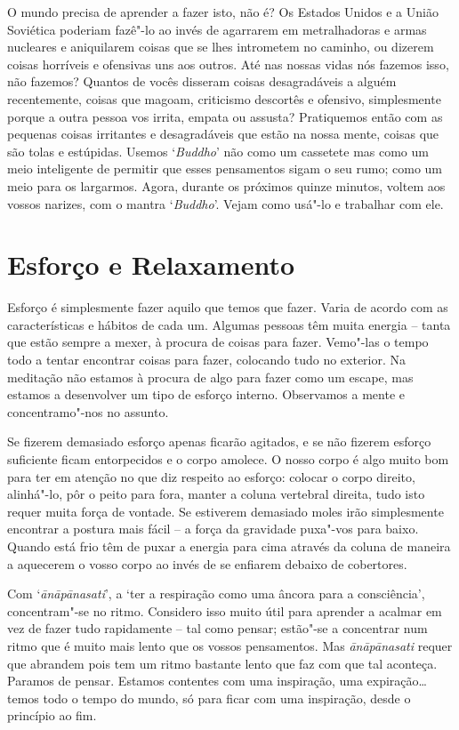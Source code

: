 O mundo precisa de aprender a fazer isto, não é? Os Estados Unidos e a
União Soviética poderiam fazê"-lo ao invés de agarrarem em metralhadoras
e armas nucleares e aniquilarem coisas que se lhes intrometem no
caminho, ou dizerem coisas horríveis e ofensivas uns aos outros. Até nas
nossas vidas nós fazemos isso, não fazemos? Quantos de vocês disseram
coisas desagradáveis a alguém recentemente, coisas que magoam,
criticismo descortês e ofensivo, simplesmente porque a outra pessoa vos
irrita, empata ou assusta? Pratiquemos então com as pequenas coisas
irritantes e desagradáveis que estão na nossa mente, coisas que são
tolas e estúpidas. Usemos `\emph{Buddho}' não como um cassetete mas como
um meio inteligente de permitir que esses pensamentos sigam o seu rumo;
como um meio para os largarmos. Agora, durante os próximos quinze
minutos, voltem aos vossos narizes, com o mantra `\emph{Buddho}'. Vejam
como usá"-lo e trabalhar com ele.

\chapter{Esforço e Relaxamento}

Esforço é simplesmente fazer aquilo que temos que fazer. Varia de acordo
com as características e hábitos de cada um. Algumas pessoas têm muita
energia -- tanta que estão sempre a mexer, à procura de coisas para
fazer. Vemo"-las o tempo todo a tentar encontrar coisas para fazer,
colocando tudo no exterior. Na meditação não estamos à procura de algo
para fazer como um escape, mas estamos a desenvolver um tipo de esforço
interno. Observamos a mente e concentramo"-nos no assunto.

Se fizerem demasiado esforço apenas ficarão agitados, e se não fizerem
esforço suficiente ficam entorpecidos e o corpo amolece. O nosso corpo é
algo muito bom para ter em atenção no que diz respeito ao esforço:
colocar o corpo direito, alinhá"-lo, pôr o peito para fora, manter a
coluna vertebral direita, tudo isto requer muita força de vontade. Se
estiverem demasiado moles irão simplesmente encontrar a postura mais
fácil -- a força da gravidade puxa"-vos para baixo. Quando está frio têm
de puxar a energia para cima através da coluna de maneira a aquecerem o
vosso corpo ao invés de se enfiarem debaixo de cobertores.

Com `\emph{ānāpānasati}', a `ter a respiração como uma âncora para a
consciência', concentram"-se no ritmo. Considero isso muito útil para
aprender a acalmar em vez de fazer tudo rapidamente -- tal como pensar;
estão"-se a concentrar num ritmo que é muito mais lento que os vossos
pensamentos. Mas \emph{ānāpānasati} requer que abrandem pois tem um
ritmo bastante lento que faz com que tal aconteça. Paramos de pensar.
Estamos contentes com uma inspiração, uma expiração\ldots{} temos todo o
tempo do mundo, só para ficar com uma inspiração, desde o princípio ao
fim.

